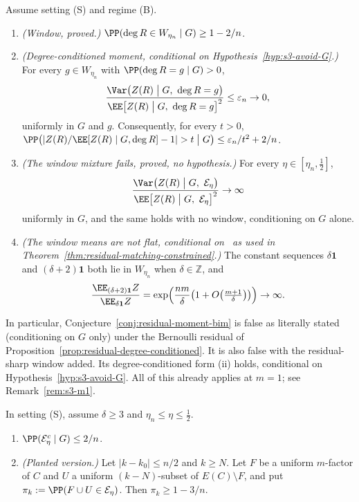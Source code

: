 \begin{theorem}
\label{thm:residual-moment-bim-proof}
Assume setting (S) and regime (B).
\begin{enumerate}
\item[\textup{(i)}] \emph{(Window, proved.)} \(\PP(\deg R\in W_{\eta_n}\mid G)\ge1-2/n\).
\item[\textup{(ii)}] \emph{(Degree-conditioned moment, conditional on
Hypothesis~\ref{hyp:s3-avoid-G}.)} For every \(g\in W_{\eta_n}\) with
\(\PP(\deg R=g\mid G)>0\),
\[
\frac{\Var\bigl(Z(R)\bigm|G,\ \deg R=g\bigr)}{\EE\bigl[Z(R)\bigm|G,\ \deg R=g\bigr]^2}\le\varepsilon_n\to0 ,
\]
uniformly in \(G\) and \(g\). Consequently, for every \(t>0\),
\(\PP\bigl(\lvert Z(R)/\EE[Z(R)\mid G,\deg R]-1\rvert>t\bigm|G\bigr)\le\varepsilon_n/t^2+2/n\).
\item[\textup{(iii)}] \emph{(The window mixture fails, proved, no hypothesis.)} For every
\(\eta\in[\eta_n,\tfrac12]\),
\[
\frac{\Var\bigl(Z(R)\bigm|G,\ \mathcal E_\eta\bigr)}{\EE\bigl[Z(R)\bigm|G,\ \mathcal E_\eta\bigr]^2}\to\infty
\]
uniformly in \(G\), and the same holds with no window, conditioning on \(G\) alone.
\item[\textup{(iv)}] \emph{(The window means are not flat, conditional on~\cite[Theorem~4.6]{McK85}
as used in Theorem~\ref{thm:residual-matching-constrained}.)} The constant
sequences \(\delta\mathbf 1\) and \((\delta+2)\mathbf 1\) both lie in \(W_{\eta_n}\) when
\(\delta\in\mathbb Z\), and
\[
\frac{\EE_{(\delta+2)\mathbf 1}Z}{\EE_{\delta\mathbf 1}Z}
=\exp\Bigl(\frac{nm}{\delta}\bigl(1+O\bigl(\tfrac{m+1}{\delta}\bigr)\bigr)\Bigr)\to\infty .
\]
\end{enumerate}
In particular, Conjecture~\ref{conj:residual-moment-bim} is false as literally stated
(conditioning on \(G\) only) under the Bernoulli residual of
Proposition~\ref{prop:residual-degree-conditioned}. It is also false with the
residual-sharp window added. Its degree-conditioned form (ii) holds, conditional
on Hypothesis~\ref{hyp:s3-avoid-G}. All of this already applies at \(m=1\);
see Remark~\ref{rem:s3-m1}.
\end{theorem}

\begin{lemma}
\label{lem:s3-window}
In setting (S), assume \(\delta\ge3\) and \(\eta_n\le\eta\le\frac12\).
\begin{enumerate}
\item[\textup{(a)}] \(\PP(\mathcal E_\eta^c\mid G)\le2/n\).
\item[\textup{(b)}] \emph{(Planted version.)} Let \(\lvert k-k_0\rvert\le n/2\) and \(k\ge N\). Let
\(F\) be a uniform \(m\)-factor of \(C\) and \(U\) a uniform \((k-N)\)-subset of
\(E(C)\setminus F\), and put \(\pi_k:=\PP(F\cup U\in\mathcal E_\eta)\). Then
\(\pi_k\ge1-3/n\).
\end{enumerate}
\end{lemma}

